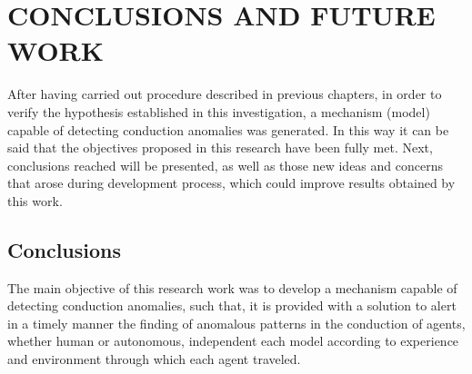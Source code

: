\chapter{\uppercase{CONCLUSIONS AND FUTURE WORK}}
\label{Capitulo 7}

After having carried out procedure described in previous chapters, in order to verify the hypothesis established in this investigation, a mechanism (model) capable of detecting conduction anomalies was generated. In this way it can be said that the objectives proposed in this research have been fully met. Next, conclusions reached will be presented, as well as those new ideas and concerns that arose during development process, which could improve results obtained by this work.

\section{Conclusions}

The main objective of this research work was to develop a mechanism capable of detecting conduction anomalies, such that, it is provided with a solution to alert in a timely manner the finding of anomalous patterns in the conduction of agents, whether human or autonomous, independent each model according to experience and environment through which each agent traveled.

\vspace{5mm} %

